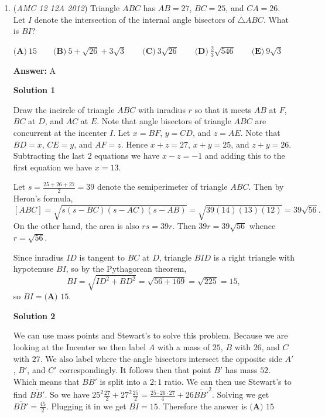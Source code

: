 \begin{enumerate}
 In a similar manner, we calculate the element using the same logic. We find that $2\pmod{5}$ has $5$ elements, and $1\pmod{5}$ has $8$ elements, meaning that there are a total of $13$ elements, which is the answer. ~CharmaineMa07292010

 Note: the problem where this is linked is covered 0:20-1:15

 


	\item (\textit{AMC 12 12A 2012}) Triangle $ABC$ has $AB=27$, $BC=25$, and $CA=26$.  Let $I$ denote the intersection of the internal angle bisectors of $\triangle ABC$.  What is $BI$?


 $\textbf{(A)}\ 15\qquad\textbf{(B)}\ 5+\sqrt{26}+3\sqrt{3}\qquad\textbf{(C)}\ 3\sqrt{26}\qquad\textbf{(D)}\ \frac{2}{3}\sqrt{546}\qquad\textbf{(E)}\ 9\sqrt{3}$

 \textbf{Answer: }A



\textbf{Solution 1}

Draw the incircle of triangle $ABC$ with inradius $r$ so that it meets $AB$ at $F$, $BC$ at $D$, and $AC$ at $E$. Note that angle bisectors of triangle $ABC$ are concurrent at the incenter $I$. Let $x=BF$, $y=CD$, and $z=AE$. Note that $BD=x$, $CE=y$, and $AF=z$. Hence $x+z=27$, $x+y=25$, and $z+y=26$. Subtracting the last 2 equations we have $x-z=-1$ and adding this to the first equation we have $x=13$. 

 Let $s=\frac{25+26+27}{2} = 39$ denote the semiperimeter of triangle $ABC$. Then by Heron's formula,
 \[[ABC] = \sqrt{s(s-BC)(s-AC)(s-AB)} = \sqrt{39(14)(13)(12)} = 39\sqrt{56}.\]On the other hand, the area is also $rs = 39r$. Then $39r=39\sqrt{56}$ whence $r=\sqrt{56}$.

 Since inradius $ID$ is tangent to $BC$ at $D$, triangle $BID$ is a right triangle with hypotenuse $BI$, so by the Pythagorean theorem,
 \[BI = \sqrt{ID^2+BD^2} = \sqrt{56+169} = \sqrt{225} = 15,\]so $BI=\boxed{\textbf{(A) } 15}$.

 



\textbf{Solution 2}

We can use mass points and Stewart's to solve this problem. Because we are looking at the Incenter we then label $A$ with a mass of $25$, $B$ with $26$, and $C$ with $27$. We also label where the angle bisectors intersect the opposite side $A'$, $B'$, and $C'$ correspondingly. It follows then that point $B'$ has mass $52$. Which means that $\overline{BB'}$ is split into a $2:1$ ratio. We can then use Stewart's to find $\overline{BB'}$. So we have $25^2\frac{27}{2} + 27^2\frac{25}{2} = \frac{25 \cdot 26 \cdot 27}{4} + 26\overline{BB'}^2$. Solving we get $\overline{BB'} = \frac{45}{2}$. Plugging it in we get $\overline{BI} = 15$. Therefore the answer is $\boxed{\textbf{(A) } 15}$


\end{enumerate}
